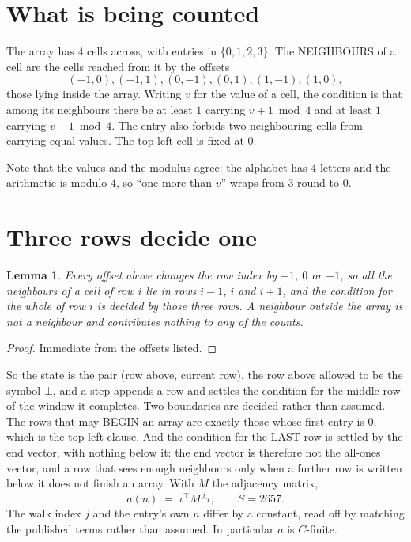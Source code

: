 \documentclass[11pt,a4paper]{article}
\theoremstyle{plain}
\newtheorem{lemma}[theorem]{Lemma}
\theoremstyle{definition}
\begin{document}
\section{What is being counted}

The array has $4$ cells across, with entries in $\{0,1,2,3\}$. The NEIGHBOURS of a cell are the
cells reached from it by the offsets
\[
(-1,0), (-1,1), (0,-1), (0,1), (1,-1), (1,0),
\]
those lying inside the array. Writing $v$ for the value of a cell, the condition is that among
its neighbours there be at least $1$ carrying $v+1 \bmod 4$ and at least $1$ carrying $v-1 \bmod 4$. The entry also forbids two neighbouring cells from carrying equal values. The top left
cell is fixed at $0$.

Note that the values and the modulus agree: the alphabet has $4$ letters and the arithmetic
is modulo $4$, so ``one more than $v$'' wraps from $3$ round to $0$.

\section{Three rows decide one}

\begin{lemma}\label{lem:win}
Every offset above changes the row index by $-1$, $0$ or $+1$, so all the neighbours of a cell
of row $i$ lie in rows $i-1$, $i$ and $i+1$, and the condition for the whole of row $i$ is
decided by those three rows. A neighbour outside the array is not a neighbour and contributes
nothing to any of the counts.
\end{lemma}

\begin{proof}
Immediate from the offsets listed.
\end{proof}

So the state is the pair (row above, current row), the row above allowed to be the symbol
$\bot$, and a step appends a row and settles the condition for the middle row of the window it
completes. Two boundaries are decided rather than assumed. The rows that may BEGIN an array are
exactly those whose first entry is $0$, which is the top-left clause. And the condition for the
LAST row is settled by the end vector, with nothing below it: the end vector is therefore not
the all-ones vector, and a row that sees enough neighbours only when a further row is written
below it does not finish an array. With $M$ the adjacency matrix,
\[
a(n)\;=\;\iota^{\!\top}M^{\,j}\tau ,\qquad S=2657.
\]
The walk index $j$ and the entry's own $n$ differ by a constant, read off by matching the
published terms rather than assumed. In particular $a$ is $C$-finite.
\end{document}

